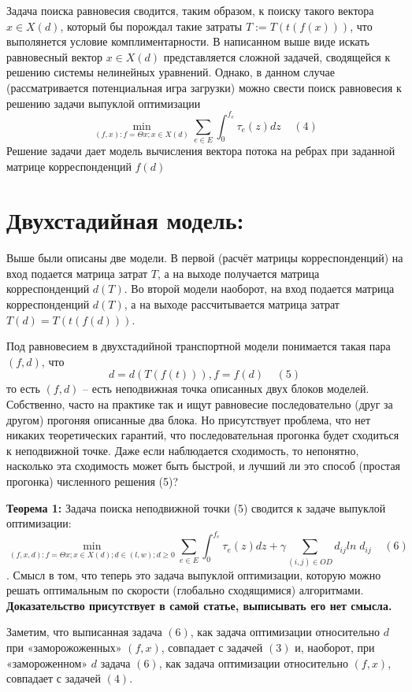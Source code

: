 \documentclass{article}
\begin{document}
Задача поиска равновесия сводится, таким образом, к поиску такого вектора $x \in X(d)$, который бы порождал такие затраты $T := T(t(f(x)))$, что выполянется условие комплиментарности. В написанном выше виде искать равновесный вектор $x \in X(d)$ представляется сложной задачей, сводящейся к решению системы нелинейных уравнений. Однако, в данном случае (рассматривается потенциальная игра загрузки) можно свести поиск равновесия к решению задачи выпуклой оптимизации
$$ \min_{(f,x): f = \Theta x; x \in X(d)} \sum_{e \in E} \int_0^{f_e}\tau_e(z)dz \;\;\;\; (4)$$
Решение задачи дает модель вычисления вектора потока на ребрах при заданной матрице корреспонденций $f(d)$

\section{Двухстадийная модель:}
Выше были описаны две модели. В первой (расчёт матрицы корреспонденций) на вход подается матрица затрат $T$, а на выходе получается матрица корреспонденций $d(T)$. Во второй модели наоборот, на вход подается матрица корреспонденций $d(T)$, а на выходе рассчитывается матрица затрат $T(d) = T(t(f(d)))$.

Под равновесием в двухстадийной транспортной модели понимается такая пара $(f, d)$, что
$$d = d(T(f(t))), f = f(d) \;\;\;\; (5)$$
то есть $(f, d)$ – есть неподвижная точка описанных двух блоков моделей. Собственно, часто на практике так и ищут равновесие последовательно (друг за другом) прогоняя описанные два блока. Но присутствует проблема, что нет никаких теоретических гарантий, что последовательная прогонка будет сходиться к неподвижной точке.
Даже если наблюдается сходимость, то непонятно, насколько эта сходимость может быть быстрой, и лучший ли это способ  (простая прогонка) численного решения (5)?

\textbf{Теорема 1:} Задача поиска неподвижной точки (5) сводится к задаче выпуклой оптимизации:
$$ \min_{(f,x,d): f=\Theta x; x \in X(d); d \in (l,w); d \ge 0}\sum_{e \in E} \int_0^{f_e} \tau_e(z)dz + \gamma \sum_{(i,j) \in OD} d_{ij} ln \; d_{ij} \;\;\;\; (6)$$.
Смысл в том, что теперь это задача выпуклой оптимизации, которую можно решать оптимальным по скорости (глобально сходящимися) алгоритмами.
\textbf{Доказательство присутствует в самой статье, выписывать его нет смысла.}

Заметим, что выписанная задача $(6)$, как задача оптимизации относительно $d$ при «заморожоженных» $(f, x)$, совпадает с задачей $(3)$ и, наоборот, при «замороженном» $d$ задача $(6)$, как задача оптимизации относительно $(f, x)$, совпадает с задачей $(4)$.
\end{document}
